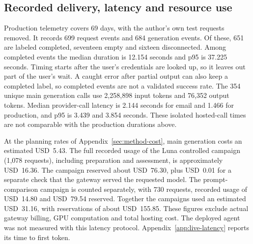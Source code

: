 \subsection{Recorded delivery, latency and resource use}
\label{sec:delivery}

Production telemetry covers 69 days, with the author's own test requests removed. It records 699 request events and 684 generation events. Of these, 651 are labeled completed, seventeen empty and sixteen disconnected. Among completed events the median duration is 12.154 seconds and p95 is 37.225 seconds. Timing starts after the user's credentials are looked up, so it leaves out part of the user's wait. A caught error after partial output can also keep a completed label, so completed events are not a validated success rate.
The 354 unique main generation calls use 2,258,898 input tokens and 76,352 output tokens. Median provider-call latency is 2.144 seconds for email and 1.466 for production, and p95 is 3.439 and 3.854 seconds. These isolated hosted-call times are not comparable with the production durations above.

At the planning rates of Appendix~\ref{sec:method-cost}, main generation costs an estimated USD~5.43. The full recorded usage of the Luna controlled campaign (1,078 requests), including preparation and assessment, is approximately USD~16.36. The campaign reserved about USD~76.30, plus USD~0.01 for a separate check that the gateway served the requested model. The prompt-comparison campaign is counted separately, with 730 requests, recorded usage of USD~14.80 and USD~79.54 reserved. Together the campaigns used an estimated USD~31.16, with reservations of about USD~155.85. These figures exclude actual gateway billing, GPU computation and total hosting cost. The deployed agent was not measured with this latency protocol. Appendix~\ref{app:live-latency} reports its time to first token.

